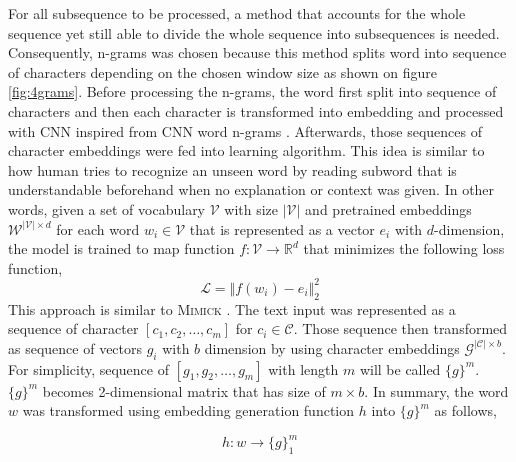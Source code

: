        For all subsequence to be processed, a method that accounts
        for the whole sequence yet still able to divide the whole
        sequence into subsequences is needed. Consequently, n-grams
        was chosen because this method splits word into sequence of
        characters depending on the chosen window size as shown on
        figure \ref{fig:4grams}. Before processing the n-grams, the
        word first split into sequence of characters and then each
        character is transformed into embedding and processed with CNN
        inspired from CNN word n-grams \citep{convolutional2014kim}.
        Afterwards, those sequences of character embeddings were fed
        into learning algorithm. This idea is similar to how human
        tries to recognize an unseen word by reading subword that is
        understandable beforehand when no explanation or context was
        given. In other words, given a set of vocabulary $\mathcal{V}$
        with size $\vert\mathcal{V}\vert$ and pretrained embeddings
        $\mathcal{W}^{\vert\mathcal{V}\vert \times d}$ for each word
        $w_{i} \in \mathcal{V}$ that is represented as a vector $e_i$
        with $d$-dimension, the model is trained to map function
        $f:\mathcal{V} \rightarrow \mathbb{R}^d$ that minimizes the
        following loss function,
        \begin{equation}
            \label{eq:lossfn}
            \mathcal{L} = \Vert f(w_i) - e_i \Vert^{2}_2
        \end{equation}
        This approach is similar to \textsc{Mimick}
        \cite{mimicking2017Pinter}. The text input was represented as
        a sequence of character $[c_1, c_2, \dots, c_m]$ for $c_i \in
        \mathcal{C}$. Those sequence then transformed as sequence of
        vectors $g_i$ with $b$ dimension by using character embeddings
        $\mathcal{G}^{\vert \mathcal{C} \vert \times b}$. For
        simplicity, sequence of $[g_1, g_2, \dots, g_m]$ with length
        $m$ will be called $\{g\}^m$. $\{g\}^m$ becomes 2-dimensional
        matrix that has size of $m \times b$. In summary, the word
        $w$ was transformed using embedding generation function $h$
        into $\{g\}^m$ as follows,

        \begin{equation}
            \label{eq:word2charemb}
            h: w \rightarrow \{g\}_1^m
        \end{equation}

